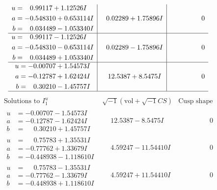 \documentclass[1p]{elsarticle_modified}
\theoremstyle{definition}
\newcommand{\I}{\sqrt{-1}}
\begin{document}
$$\begin{array}{c|c|c}
\begin{aligned}
u &= \phantom{-}0.99117 + 1.12526 I \\
a &= -0.548310 + 0.653114 I \\
b &= \phantom{-}0.034489 - 1.053340 I\end{aligned}
 & \phantom{-}0.02289 + 1.75896 I & \phantom{-0.000000 } 0 \\ \hline\begin{aligned}
u &= \phantom{-}0.99117 - 1.12526 I \\
a &= -0.548310 - 0.653114 I \\
b &= \phantom{-}0.034489 + 1.053340 I\end{aligned}
 & \phantom{-}0.02289 - 1.75896 I & \phantom{-0.000000 } 0 \\ \hline\begin{aligned}
u &= -0.00707 + 1.54573 I \\
a &= -0.12787 + 1.62424 I \\
b &= \phantom{-}0.30210 - 1.45757 I\end{aligned}
 & \phantom{-}12.5387 + 8.5475 I & \phantom{-0.000000 } 0\\
 \hline 
 \end{array}$$\newpage$$\begin{array}{c|c|c}  
\text{Solutions to }I^u_{1}& \I (\text{vol} + \sqrt{-1}CS) & \text{Cusp shape}\\
 \hline 
\begin{aligned}
u &= -0.00707 - 1.54573 I \\
a &= -0.12787 - 1.62424 I \\
b &= \phantom{-}0.30210 + 1.45757 I\end{aligned}
 & \phantom{-}12.5387 - 8.5475 I & \phantom{-0.000000 } 0 \\ \hline\begin{aligned}
u &= \phantom{-}0.75783 + 1.35531 I \\
a &= -0.77762 + 1.33679 I \\
b &= -0.448938 - 1.118610 I\end{aligned}
 & \phantom{-}4.59247 - 11.54410 I & \phantom{-0.000000 } 0 \\ \hline\begin{aligned}
u &= \phantom{-}0.75783 - 1.35531 I \\
a &= -0.77762 - 1.33679 I \\
b &= -0.448938 + 1.118610 I\end{aligned}
 & \phantom{-}4.59247 + 11.54410 I & \phantom{-0.000000 } 0 \\ \hline\begin{aligned}

\end{aligned}
\end{array}$$
\end{document}
